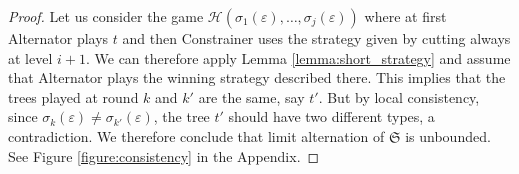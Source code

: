 \begin{proof}
Let us consider the game $\mathcal{H}( \sigma_1(\varepsilon), \dots, \sigma_j(\varepsilon))$ where at first Alternator plays $t$ and then Constrainer uses the strategy given by cutting always at level $i+1$. We can therefore apply Lemma \ref{lemma:short_strategy} and assume that Alternator plays the winning strategy described there. This implies that the trees played at round $k$ and $k'$ are the same, say $t'$. But by local consistency, since $\sigma_k(\varepsilon)\neq \sigma_{k'}(\varepsilon)$, the tree $t'$ should have two different types, a contradiction. We therefore conclude that limit alternation of $\mathfrak{S}$ is unbounded. 
See Figure \ref{figure:consistency} in the Appendix.
\end{proof}
